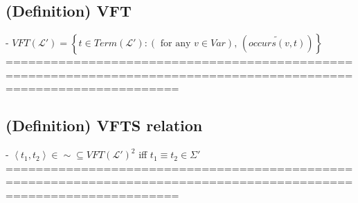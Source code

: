 \documentclass{book}
\newcommand{\pnot}[1]{\widetilde{#1}}
\newcommand{\txtforall}[2]{\left(\text{ for any }#1\right)\text{, }\left(#2\right)}
\newcommand{\occurs}[2]{occurs(#1, #2)}
\newcommand{\set}[1]{\left\{ #1 \right\}}
\newcommand{\seq}[1]{\left\langle #1 \right\rangle}
\begin{document}
\subsection{(Definition) VFT}
	- $VFT(\mathcal{L}') = \set{t \in Term(\mathcal{L}'): \txtforall{v \in Var}{\pnot{\occurs{v}{t}}}}$ \\
	===================================================================================================================
\subsection{(Definition) VFTS relation}
	- $\seq{t_1, t_2} \in \sim \subseteq VFT(\mathcal{L}')^2$ iff $t_1 \equiv t_2 \in \Sigma'$ \\
	===================================================================================================================
\end{document}
